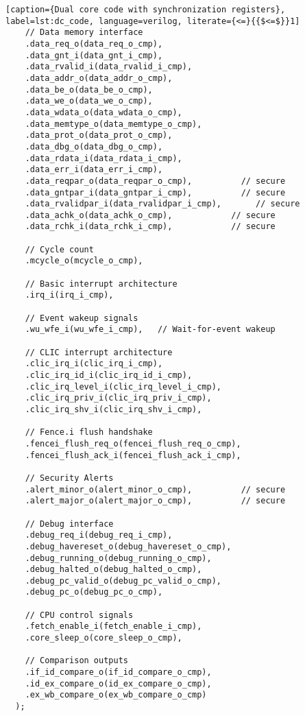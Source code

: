 \begin{lstlisting}[caption={Dual core code with synchronization registers}, label=lst:dc_code, language=verilog, literate={<=}{{$<=$}}1]
    // Data memory interface
    .data_req_o(data_req_o_cmp),
    .data_gnt_i(data_gnt_i_cmp),
    .data_rvalid_i(data_rvalid_i_cmp),
    .data_addr_o(data_addr_o_cmp),
    .data_be_o(data_be_o_cmp),
    .data_we_o(data_we_o_cmp),
    .data_wdata_o(data_wdata_o_cmp),
    .data_memtype_o(data_memtype_o_cmp),
    .data_prot_o(data_prot_o_cmp),
    .data_dbg_o(data_dbg_o_cmp),
    .data_rdata_i(data_rdata_i_cmp),
    .data_err_i(data_err_i_cmp),
    .data_reqpar_o(data_reqpar_o_cmp),          // secure
    .data_gntpar_i(data_gntpar_i_cmp),          // secure
    .data_rvalidpar_i(data_rvalidpar_i_cmp),       // secure
    .data_achk_o(data_achk_o_cmp),            // secure
    .data_rchk_i(data_rchk_i_cmp),            // secure

    // Cycle count
    .mcycle_o(mcycle_o_cmp),

    // Basic interrupt architecture
    .irq_i(irq_i_cmp),

    // Event wakeup signals
    .wu_wfe_i(wu_wfe_i_cmp),   // Wait-for-event wakeup

    // CLIC interrupt architecture
    .clic_irq_i(clic_irq_i_cmp),
    .clic_irq_id_i(clic_irq_id_i_cmp),
    .clic_irq_level_i(clic_irq_level_i_cmp),
    .clic_irq_priv_i(clic_irq_priv_i_cmp),
    .clic_irq_shv_i(clic_irq_shv_i_cmp),

    // Fence.i flush handshake
    .fencei_flush_req_o(fencei_flush_req_o_cmp),
    .fencei_flush_ack_i(fencei_flush_ack_i_cmp),

    // Security Alerts
    .alert_minor_o(alert_minor_o_cmp),          // secure
    .alert_major_o(alert_major_o_cmp),          // secure

    // Debug interface
    .debug_req_i(debug_req_i_cmp),
    .debug_havereset_o(debug_havereset_o_cmp),
    .debug_running_o(debug_running_o_cmp),
    .debug_halted_o(debug_halted_o_cmp),
    .debug_pc_valid_o(debug_pc_valid_o_cmp),
    .debug_pc_o(debug_pc_o_cmp),

    // CPU control signals
    .fetch_enable_i(fetch_enable_i_cmp),
    .core_sleep_o(core_sleep_o_cmp),

    // Comparison outputs
    .if_id_compare_o(if_id_compare_o_cmp),
    .id_ex_compare_o(id_ex_compare_o_cmp),
    .ex_wb_compare_o(ex_wb_compare_o_cmp)
  );

\end{lstlisting}

